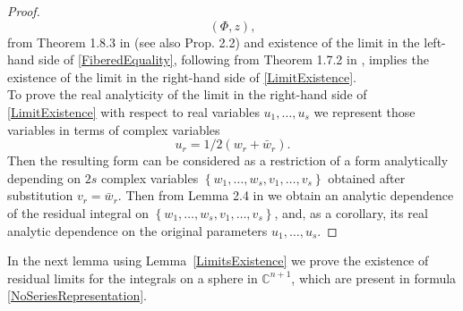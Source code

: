 \documentclass[11pt,reqno]{amsart}
\numberwithin{equation}{section}
\begin{document}
\begin{proof}
\begin{equation}
\left(\Phi,z\right),
\end{equation}
from Theorem 1.8.3 in \cite{CH} (see also \cite{HP4} Prop. 2.2) and existence of the limit in the left-hand side of
\eqref{FiberedEquality}, following from Theorem 1.7.2 in \cite{CH}, implies the existence
of the limit in the right-hand side of \eqref{LimitExistence}.\\
\indent
To prove the real analyticity of the limit in the right-hand side of \eqref{LimitExistence}
with respect to real variables $u_1,\dots, u_s$ we represent those variables
in terms of complex variables
$$u_r=1/2\left(w_r+{\bar w}_r\right).$$
Then the resulting form can be considered as a restriction of a form analytically depending
on $2s$ complex variables $\left\{w_1,\dots,w_s, v_1,\dots,v_s\right\}$ obtained after
substitution $v_r={\bar w}_r$. Then from Lemma 2.4 in \cite{HP4} we obtain an analytic
dependence of the residual integral on $\left\{w_1,\dots,w_s, v_1,\dots,v_s\right\}$,
and, as a corollary, its real analytic dependence on the original parameters
$u_1,\dots, u_s$.
\end{proof}

\indent
In the next lemma using Lemma~\ref{LimitsExistence} we prove the existence of residual limits
for the integrals on a sphere in ${{\mathbb C}}^{n+1}$, which are present in
formula \eqref{NoSeriesRepresentation}.
\end{document}
